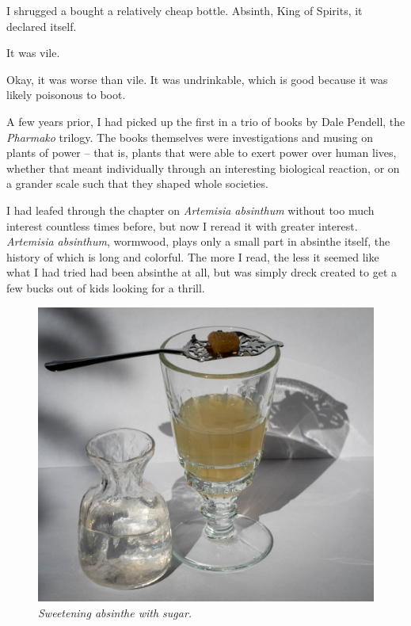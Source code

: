 \documentclass[12pt,letterpaper,oneside]{memoir}
\begin{document}
  I shrugged a bought a relatively cheap bottle.  Absinth, King of Spirits, it declared itself.

  It was vile.

  Okay, it was worse than vile.  It was undrinkable, which is good because it was likely poisonous to boot.

  A few years prior, I had picked up the first in a trio of books by Dale Pendell, the \textit{Pharmako} trilogy.  The books themselves were investigations and musing on plants of power -- that is, plants that were able to exert power over human lives, whether that meant individually through an interesting biological reaction, or on a grander scale such that they shaped whole societies.

  I had leafed through the chapter on \textit{Artemisia absinthum} without too much interest countless times before, but now I reread it with greater interest.  \textit{Artemisia absinthum}, wormwood, plays only a small part in absinthe itself, the history of which is long and colorful.  The more I read, the less it seemed like what I had tried had been absinthe at all, but was simply dreck created to get a few bucks out of kids looking for a thrill.

  \begin{figure}
    \includegraphics[width=\linewidth]{../../assets/tasting/naa-sugar.jpg}
    \textit{Sweetening absinthe with sugar.}
  \end{figure}
\end{document}
